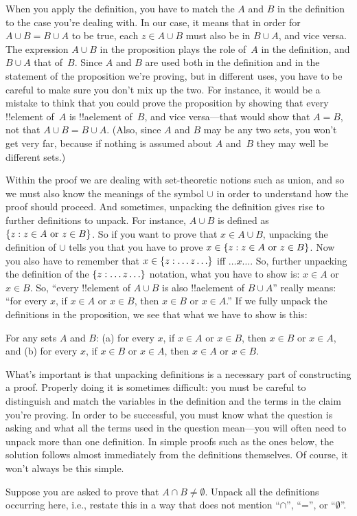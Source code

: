 \documentclass[../../../include/open-logic-section]{subfiles}
\begin{document}
When you apply the definition, you have to match the $A$ and $B$ in
the definition to the case you're dealing with.  In our case, it means
that in order for $A \cup B = B \cup A$ to be true, each $z \in A \cup
B$ must also be in $B \cup A$, and vice versa.  The expression $A \cup
B$ in the proposition plays the role of~$A$ in the definition, and $B
\cup A$ that of~$B$. Since $A$ and $B$ are used both in the definition
and in the statement of the proposition we're proving, but in
different uses, you have to be careful to make sure you don't mix up
the two.  For instance, it would be a mistake to think that you could
prove the proposition by showing that every !!{element} of~$A$ is
!!a{element} of~$B$, and vice versa---that would show that $A = B$,
not that $A \cup B = B \cup A$. (Also, since $A$ and $B$ may be any
two sets, you won't get very far, because if nothing is assumed about
$A$ and~$B$ they may well be different sets.)

Within the proof we are dealing with set-theoretic notions such as
union, and so we must also know the meanings of the symbol $\cup$ in
order to understand how the proof should proceed. And sometimes,
unpacking the definition gives rise to further definitions to
unpack. For instance, $A \cup B$ is defined as $\{ z : z \in A
  \text{ or } z \in B \}$. So if you want to prove that $x \in A \cup
B$, unpacking the definition of $\cup$ tells you that you have to
prove $x \in \{ z : z \in A \text{ or } z \in B \}$.  Now you also
have to remember that $x \in \Setabs{z}{\dots z\dots}$ iff $\dots
x\dots$.  So, further unpacking the definition of the
$\Setabs{z}{\dots z \dots}$ notation, what you have to show is: $x \in
A$ or $x \in B$. So, ``every !!{element} of $A \cup B$ is also
!!a{element} of $B \cup A$'' really means: ``for every $x$, if $x \in
A$ or $x \in B$, then $x \in B$ or $x \in A$.''  If we fully
unpack the definitions in the proposition, we see that what we have to
show is this:

\begin{prop}
For any sets $A$ and $B$: (a) for every $x$, if $x \in A$ or $x \in
B$, then $x \in B$ or $x \in A$, and (b) for every $x$, if $x \in B$
or $x \in A$, then $x \in A$ or $x \in B$.
\end{prop}

What's important is that unpacking definitions is a necessary part of
constructing a proof. Properly doing it is sometimes difficult: you
must be careful to distinguish and match the variables in the
definition and the terms in the claim you're proving.  In order to be
successful, you must know what the question is asking and what all the
terms used in the question mean---you will often need to unpack more
than one definition.  In simple proofs such as the ones below, the
solution follows almost immediately from the definitions
themselves. Of course, it won't always be this simple.

\begin{prob}
Suppose you are asked to prove that $A \cap B \neq \emptyset$. Unpack
all the definitions occurring here, i.e., restate this in a way that
does not mention ``$\cap$'', ``='', or ``$\emptyset$''.
\end{prob}
\end{document}
